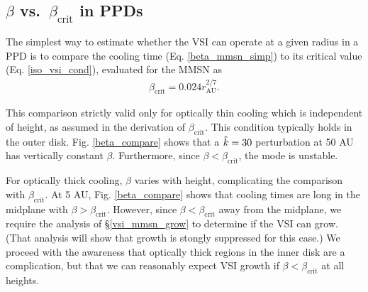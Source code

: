 \subsection{$\beta$ vs.\ $\beta_\mathrm{crit}$ in PPDs}\label{bcritPPD} 
The simplest way to estimate whether the VSI can operate at a given radius in a PPD is to 
compare the cooling time (Eq. \ref{beta_mmsn_simp}) to 
its critical value (Eq. \ref{iso_vsi_cond}), evaluated for the MMSN as    
\begin{align}\label{bcrit_mmsn}
  \beta_\mathrm{crit} = 0.024r_\mathrm{AU}^{2/7}. 
\end{align}

This comparison strictly valid only for optically thin cooling which is independent of height,
as assumed in the derivation of $\beta_\mathrm{crit}$.  This condition typically holds in the outer disk.  
Fig. \ref{beta_compare} shows that a  $\hat{k}=30$ perturbation at 50 AU has vertically constant $\beta$. 
 Furthermore, since $\beta < \beta_\mathrm{crit}$, the mode is unstable.
 
For optically thick cooling, $\beta$ varies with height, complicating the comparison with $\beta_\mathrm{crit}$.   
At 5 AU, Fig. \ref{beta_compare} shows that cooling times are long in the midplane with $\beta > \beta_\mathrm{crit}$.
However, since $\beta < \beta_\mathrm{crit}$ away from the midplane, we require the analysis of \S\ref{vsi_mmsn_grow} to determine if the VSI can grow.  (That analysis will show that growth is stongly suppressed for this case.)  We proceed with the awareness that optically thick regions in the inner disk are a complication, but that we can reasonably expect VSI growth if $\beta < \beta_\mathrm{crit}$ at all heights.


%
%


